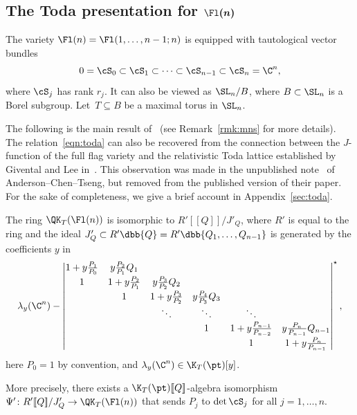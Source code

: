 \subsection[The Toda presentation for Fl(n)]{The Toda presentation for $\boldsymbol{\Fl(n)}$}

The variety $\Fl(n)=\Fl(1,\dots,n-1;n)$ is equipped with tautological vector bundles
\[
 0=\cS_{0}\subset\cS_{1}\subset\dots \subset \cS_{n-1}\subset \cS_{n}=\C^n ,
\]
where $\cS_j$ has rank $r_j$. It can also be viewed as $\SL_n/B$, where $B\subset \SL_n$ is a Borel subgroup. Let~${T\subseteq B}$ be a maximal torus in $\SL_n$.

The following is the main result of~\cite{maeno.naito.sagaki:QKideal} (see Remark~\ref{rmk:mns} for more details). The relation~\eqref{eqn:toda} can also be recovered from the connection between the $J$-function of the full flag variety and the relativistic Toda lattice established by Givental and Lee in~\cite{givental_lee}. This observation was made in the unpublished note~\cite{act:2017} of Anderson--Chen--Tseng, but removed from the published version of their paper. For the sake of completeness, we give a brief account in Appendix~\ref{sec:toda}.

\begin{Theorem}\label{thm:toda}
The ring $\QK_T(\Fl(n))$ is isomorphic to $R'[\![Q]\!]/J'_Q$, where $R'$ is equal to the ring  and the ideal $J'_Q\subset R'\dbb{Q}=R'\dbb{Q_1,\dots,Q_{n-1}}$ is generated by the coefficients $y$ in
 \begin{gather}\label{eqn:toda}
 \lambda_y(\C^n) -
 \begin{vmatrix}
 1+y\frac{P_1}{P_0} & y\frac{P_2}{P_1}Q_1 & & & & \\[0.9mm]
 1 & 1+y\frac{P_2}{P_1} & y\frac{P_3}{P_2}Q_2 & & & \\[0.9mm]
 & 1 & 1+y\frac{P_3}{P_2} & y\frac{P_{4}}{P_{3}}Q_3 & & \\
 & & \ddots & \ddots & \ddots & \\
& & & 1 & 1+y\frac{P_{n-1}}{P_{n-2}} & y\frac{P_n}{P_{n-1}}Q_{n-1}\\[1mm]
& & & & 1 & 1+y\frac{P_n}{P_{n-1}}
\end{vmatrix}^\star,
\end{gather}
here $P_0=1$ by convention, and $\lambda_y(\C^n)\in\K_T(\pt)[y]$.

More precisely,
there exists a $\K_T(\pt)[\![Q]\!]$-algebra isomorphism $\Psi'\colon R'[\![Q]\!]/J'_Q \to \QK_T(\Fl(n))$ that sends $P_j$ to $\det \cS_j$ for all $j=1,\dots,n$.
\end{Theorem}

